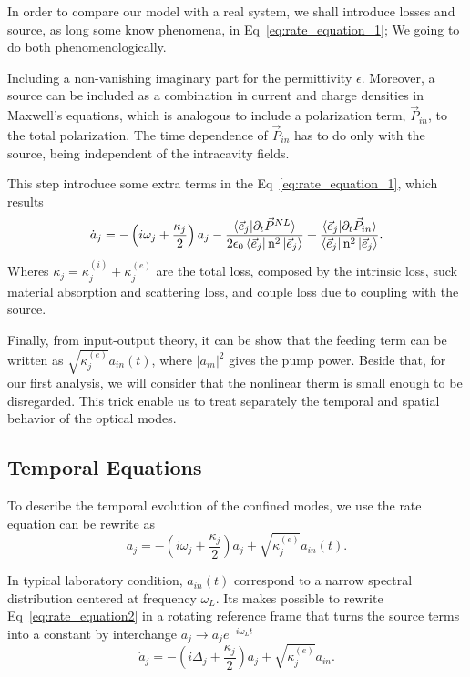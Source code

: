 In order to compare our model with a real system, we shall introduce losses and source, as long some know phenomena, in Eq~\ref{eq:rate_equation_1}; We going to do both phenomenologically.

Including a non-vanishing imaginary part for the permittivity $\epsilon$. Moreover, a source can be included as a combination in current and charge densities in Maxwell's equations, which is analogous to include a polarization term, $\vec{P}_{in}$, to the total polarization. The time dependence of $\vec{P}_{in}$ has to do only with the source, being independent of the intracavity fields.

This step introduce some extra terms in the Eq~\ref{eq:rate_equation_1}, which results
\begin{equation}
    \dot{a}_j = -\left(i\omega_j +\frac{\kappa_j}{2}\right)a_j -\frac{\braket{\vec{e}_j|\partial_t\vec{P}^{NL}}}{2\epsilon_0\bra{\vec{e}_j}\text{n}^2\ket{\vec{e}_j}}+\frac{\braket{\vec{e}_j|\partial_t\vec{P}_{in}}}{\bra{\vec{e}_j}\text{n}^2\ket{\vec{e}_j}}.
\end{equation}
Wheres $\kappa_j = \kappa^{(i)}_j+\kappa^{(e)}_j$ are the total loss, composed by the intrinsic loss, suck material absorption and scattering loss, and couple loss due to coupling with the source. 

Finally, from input-output theory, it can be show that the feeding term can be written as $\sqrt{\kappa^{(e)}_j}a_{in}(t)$, where $|a_{in}|^2$ gives the pump power. Beside that, for our first analysis, we will consider that the nonlinear therm is small enough to be disregarded. This trick enable us to treat separately the temporal and spatial behavior of the optical modes. 

\subsection{Temporal Equations}

To describe the temporal evolution of the confined modes, we use the rate equation can be rewrite as 
\begin{equation}
    \dot{a}_j = -\left(i\omega_j +\frac{\kappa_j}{2}\right)a_j +\sqrt{\kappa^{(e)}_j}a_{in}(t).
    \label{eq:rate_equation2}
\end{equation} 

In typical laboratory condition, $a_{in}(t)$ correspond to a narrow spectral distribution centered at frequency $\omega_L$. Its makes possible to rewrite Eq~\ref{eq:rate_equation2} in a rotating reference frame that turns the source terms into a constant by interchange $a_j \rightarrow a_je^{-i\omega_Lt}$
\begin{equation}
    \dot{a}_j = -\left(i\Delta_j +\frac{\kappa_j}{2}\right)a_j +\sqrt{\kappa^{(e)}_j}a_{in}.
    \label{eq:rate_equation_unperturbed}
\end{equation}



